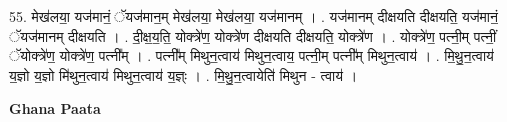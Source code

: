 \documentclass[17pt]{extarticle}
\begin{document}
55. मेख॑लया॒ यज॑मानं॒ ॅयज॑मान॒म् मेख॑लया॒ मेख॑लया॒ यज॑मानम् । . यज॑मानम् दीक्षयति दीक्षयति॒ यज॑मानं॒ ॅयज॑मानम् दीक्षयति । . दी॒क्ष॒य॒ति॒ योक्त्रे॑ण॒ योक्त्रे॑ण दीक्षयति दीक्षयति॒ योक्त्रे॑ण । . योक्त्रे॑ण॒ पत्नी॒म् पत्नीं॒ ॅयोक्त्रे॑ण॒ योक्त्रे॑ण॒ पत्नी᳚म् । . पत्नी᳚म् मिथुन॒त्वाय॑ मिथुन॒त्वाय॒ पत्नी॒म् पत्नी᳚म् मिथुन॒त्वाय॑ । . मि॒थु॒न॒त्वाय॑ य॒ज्ञो य॒ज्ञो मि॑थुन॒त्वाय॑ मिथुन॒त्वाय॑ य॒ज्ञ्ः । . मि॒थु॒न॒त्वायेति॑ मिथुन - त्वाय॑ । \newline

\textbf{Ghana Paata } \newline
\end{document}
